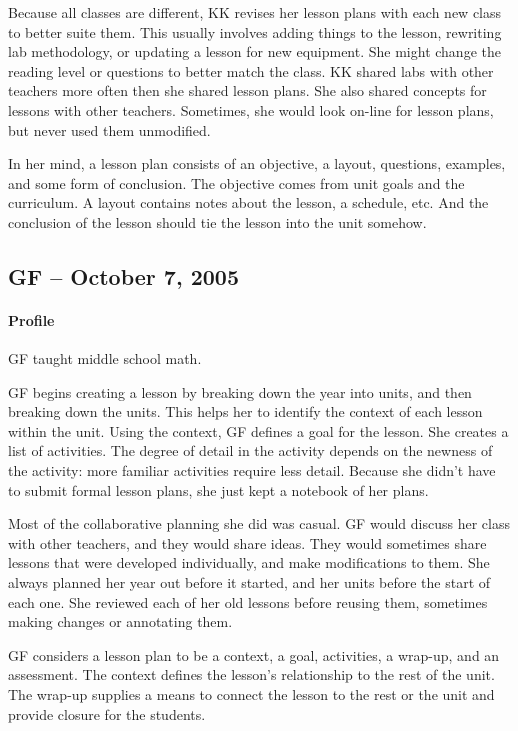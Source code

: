 \documentclass[12pt,titlepage]{article}
\begin{document}
Because all classes are different, KK revises her lesson plans with each new
class to better suite them. This usually involves adding things to the lesson,
rewriting lab methodology, or updating a lesson for new equipment. She might
change the reading level or questions to better match the class. KK shared labs
with other teachers more often then she shared lesson plans. She also shared
concepts for lessons with other teachers. Sometimes, she would look on-line for
lesson plans, but never used them unmodified.

In her mind, a lesson plan consists of an objective, a layout, questions,
examples, and some form of conclusion. The objective comes from unit goals and
the curriculum. A layout contains notes about the lesson, a schedule, etc. And
the conclusion of the lesson should tie the lesson into the unit somehow.

\subsection{GF -- October 7, 2005}
\paragraph{Profile} GF taught middle school math.

GF begins creating a lesson by breaking down the year into units, and then
breaking down the units. This helps her to identify the context of each lesson
within the unit. Using the context, GF defines a goal for the lesson. She
creates a list of activities. The degree of detail in the activity depends on
the newness of the activity: more familiar activities require less detail.
Because she didn't have to submit formal lesson plans, she just kept a notebook
of her plans.

Most of the collaborative planning she did was casual. GF would discuss her
class with other teachers, and they would share ideas. They would sometimes
share lessons that were developed individually, and make modifications to them.
She always planned her year out before it started, and her units before the
start of each one. She reviewed each of her old lessons before reusing them,
sometimes making changes or annotating them.

GF considers a lesson plan to be a context, a goal, activities, a wrap-up, and
an assessment. The context defines the lesson's relationship to the rest of the
unit. The wrap-up supplies a means to connect the lesson to the rest or the unit
and provide closure for the students.
\end{document}
